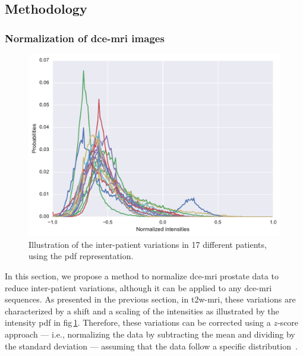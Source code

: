 \subsection{Methodology} \label{subsec:chp5:DCE-norm:meth}

\subsubsection{Normalization of \ac{dce}-\ac{mri} images}\label{subsubsec:chp5:DCE-norm:norm}

\begin{figure}
  \centering
  \includegraphics[width=0.7\linewidth]{5_normalization/figures/DCE-normalization/t2wImage.pdf}
  \caption{Illustration of the inter-patient variations in 17 different patients, using the \acs*{pdf} representation.}
  \label{fig:t2}
\end{figure}

In this section, we propose a method to normalize \ac{dce}-\ac{mri} prostate data to reduce inter-patient variations, although it can be applied to any \ac{dce}-\ac{mri} sequences.
As presented in the previous section, in \ac{t2w}-\ac{mri}, these variations are characterized by a shift and a scaling of the intensities as illustrated by the intensity \ac{pdf} in \acs{fig}\,\ref{fig:t2}.
Therefore, these variations can be corrected using a $z$-score approach --- i.e., normalizing the data by subtracting the mean and dividing by the standard deviation --- assuming that the data follow a specific distribution~\cite{lemaitre2016normalization}.

